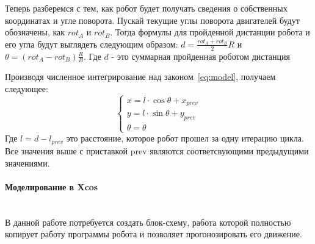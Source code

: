 \documentclass[12pt,a4paper,openany]{extarticle}
\begin{document}
Теперь разберемся с тем, как робот будет получать сведения о собственных координатах и угле поворота. Пускай текущие углы поворота двигателей будут обозначены, как $rot_A$ и $rot_B$. Тогда формулы для пройденной дистанции робота и его угла будут выглядеть следующим образом: $d = \frac{rot_A + rot_B}{2}R$ и $\theta = (rot_A - rot_B)\frac{R}{B}$. Где $d$ - это суммарная пройденная роботом дистанция

Производя численное интегрирование над законом~\eqref{eq:model}, получаем следующее:
\begin{equation}\label{eq:int_model}
\begin{cases}
x = l \cdot \cos{\theta} + x_{prev} \\
y = l \cdot \sin{\theta} + y_{prev} \\
\theta = \theta
\end{cases}
\end{equation}
Где $l = d - l_{prev}$ это расстояние, которое робот прошел за одну итерацию цикла. Все значения выше с приставкой prev являются соответсвующими предыдущими значениями.

\paragraph*{Моделирование в Xcos} \label{par:Xcos}$\phantom{-}$\\
В данной работе потребуется создать блок-схему, работа которой полностью копирует работу программы робота и позволяет прогонозировать его движение. 
\end{document}
